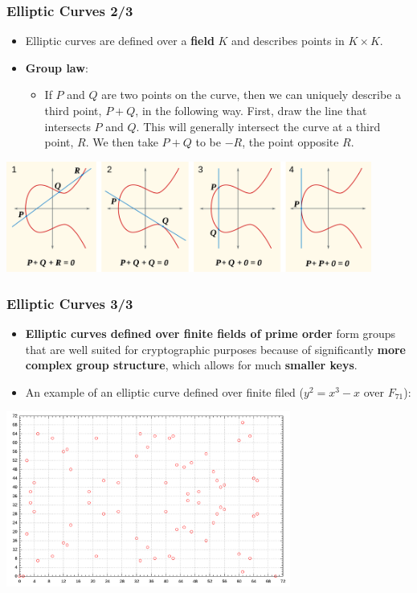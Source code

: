 \documentclass{beamer}
\begin{document}
\begin{frame}
  \frametitle{Elliptic Curves 2/3}
  \begin{itemize}
  \item Elliptic curves are defined over a \textbf{field} $K$ and describes
    points in $K \times K$.
  \item \textbf{Group law}:
    \begin{itemize}
    \item If $P$ and $Q$ are two points on the curve, then we can uniquely
      describe a third point, $P + Q$, in the following way. First, draw the
      line that intersects $P$ and $Q$. This will generally intersect the curve
      at a third point, $R$. We then take $P + Q$ to be $-R$, the point opposite
      $R$.
    \end{itemize}
  \end{itemize}
  \begin{center}
    \includegraphics[width=0.9\textwidth]{ec_group}
  \end{center}
\end{frame}

\begin{frame}
  \frametitle{Elliptic Curves 3/3}
  \begin{itemize}
  \item \textbf{Elliptic curves defined over finite fields of prime order} form
    groups that are well suited for cryptographic purposes because of
    significantly \textbf{more complex group structure}, which allows for much
    \textbf{smaller keys}.
  \item An example of an elliptic curve defined over finite filed ($y^2 = x
    ^3 - x$ over $F_{71}$):
  \end{itemize}
  \begin{center}
    \includegraphics[width=0.7\textwidth]{ec_finite_field_group}
  \end{center}
\end{frame}
\end{document}
